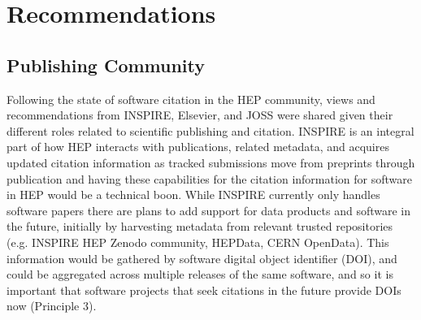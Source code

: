 \section{Recommendations}\label{sec:recommendations}

\subsection{Publishing Community}\label{sec:publishers}

Following the state of software citation in the HEP community, views and recommendations from INSPIRE, Elsevier, and JOSS were shared given their different roles related to scientific publishing and citation.
INSPIRE is an integral part of how HEP interacts with publications, related metadata, and acquires updated citation information as tracked submissions move from preprints through publication and having these capabilities for the citation information for software in HEP would be a technical boon.
While INSPIRE currently only handles software papers there are plans to add support for data products and software in the future, initially by harvesting metadata from relevant trusted repositories (e.g. INSPIRE HEP Zenodo community, HEPData, CERN OpenData).
This information would be gathered by software digital object identifier (DOI), and could be aggregated across multiple releases of the same software, and so it is important that software projects that seek citations in the future provide DOIs now (Principle 3).


